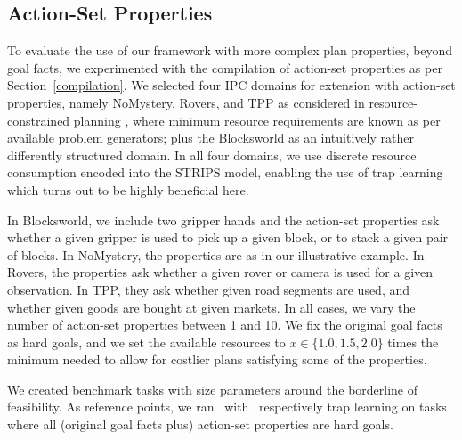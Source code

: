 
\ifdefined\suppflagdefined

\else

\subsection{Action-Set Properties}

To evaluate the use of our framework with more complex plan
properties, beyond goal facts, we experimented with the compilation of
action-set properties as per Section~\ref{compilation}. We selected
four IPC domains for extension with action-set properties, namely
NoMystery, Rovers, and TPP as considered in resource-constrained
planning \cite{nakhost:etal:icaps-12}, where minimum resource
requirements are known as per available problem generators; plus the
Blocksworld as an intuitively rather differently structured domain. In
all four domains, we use discrete resource consumption encoded into
the STRIPS model, enabling the use of trap
learning \cite{steinmetz:hoffmann:ijcai-17} which turns out to be
highly beneficial here.

In Blocksworld, we include two gripper hands and the action-set
properties ask whether a given gripper is used to pick up a given
block, or to stack a given pair of blocks. In NoMystery, the
properties are as in our illustrative example. In Rovers, the
properties ask whether a given rover or camera is used for a given
observation. In TPP, they ask whether given road segments are used,
and whether given goods are bought at given markets. In all cases, we
vary the number of action-set properties between 1 and 10. We fix the
original goal facts as hard goals, and we set the available resources
to $x \in \{1.0,1.5, 2.0\}$ times the minimum needed to allow for
costlier plans satisfying some of the properties.

We created benchmark tasks with size parameters around the borderline
of feasibility. As reference points, we ran \astar\ with \hlmcut\
respectively trap learning on tasks where all (original goal facts
plus) action-set properties are hard goals.




